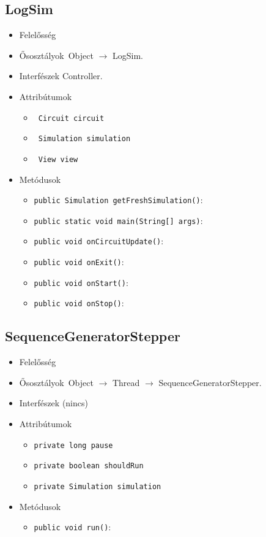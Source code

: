 \subsection{LogSim}
\begin{itemize}
\item Felelősség\\

\item Ősosztályok\ Object $\rightarrow{}$ LogSim.
\item Interfészek Controller.
\item Attribútumok $\ $
\begin{itemize}
	\item \texttt{ Circuit circuit} 
	\item \texttt{ Simulation simulation} 
	\item \texttt{ View view} 
\end{itemize}
\item Metódusok$\ $
\begin{itemize}
	\item \texttt{public Simulation getFreshSimulation()}: 
	\item \texttt{public static void main(String[] args)}: 
	\item \texttt{public void onCircuitUpdate()}: 
	\item \texttt{public void onExit()}: 
	\item \texttt{public void onStart()}: 
	\item \texttt{public void onStop()}: 
\end{itemize}
\end{itemize}

\subsection{SequenceGeneratorStepper}
\begin{itemize}
\item Felelősség\\

\item Ősosztályok\ Object $\rightarrow{}$ Thread $\rightarrow{}$ SequenceGeneratorStepper.
\item Interfészek (nincs)
\item Attribútumok $\ $
\begin{itemize}
	\item \texttt{private long pause} 
	\item \texttt{private boolean shouldRun} 
	\item \texttt{private Simulation simulation} 
\end{itemize}
\item Metódusok$\ $
\begin{itemize}
	\item \texttt{public void run()}: 
\end{itemize}
\end{itemize}

